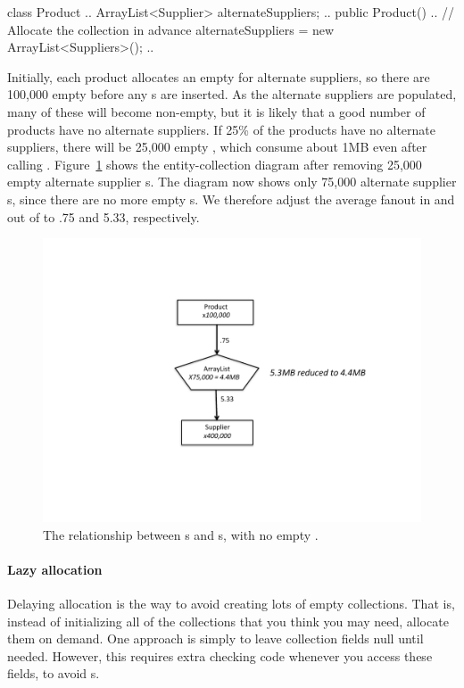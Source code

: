 \begin{shortlisting} 
class Product {
	.. 
	ArrayList<Supplier> alternateSuppliers;
	..
	public Product() {
		..
		// Allocate the collection in advance
		alternateSuppliers = new ArrayList<Suppliers>();
		..
	}
}
\end{shortlisting}
Initially, each product allocates an empty  for alternate
suppliers, so there are 100,000 empty  before any
s are inserted. As the alternate suppliers are populated, many
of these  will become non-empty, but it is likely that a good
number of products have no alternate suppliers. If 25\% of the products have no
alternate suppliers, there will be 25,000 empty , which consume
about 1MB even after calling .
Figure~\ref{fig:empty-array} shows the entity-collection
diagram after removing 25,000 empty alternate supplier s.
The diagram now shows only 75,000 alternate supplier s,
since there are no more empty s. We therefore adjust the
average fanout in and out of  to .75 and 5.33, respectively.
\begin{figure}
  \centering
 \includegraphics[width=.80\textwidth]{part1/Figures/collections/empty-product.pdf}
 \caption{The relationship between s and s,
  with no empty .}
  \label{fig:empty-array}
\end{figure}
 
 \paragraph{Lazy allocation} Delaying allocation is the way to
 avoid creating lots of empty collections.
 That is, instead of initializing all of the collections that you think you
 may need, allocate them on demand. 
 One approach is simply to leave collection fields null
 until needed. However, this requires extra checking code whenever you
 access these fields, to avoid s.
 
